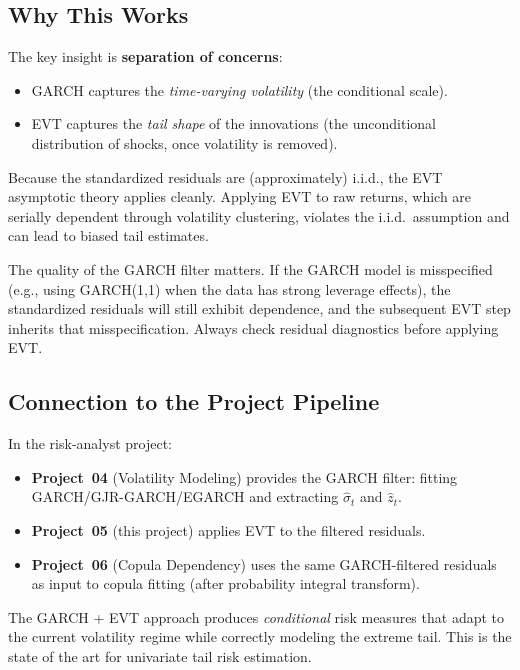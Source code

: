 \documentclass[11pt, a4paper]{article}
\theoremstyle{definition}
\theoremstyle{plain}
\theoremstyle{remark}
\begin{document}
\subsection{Why This Works}

The key insight is \textbf{separation of concerns}:
\begin{itemize}
    \item GARCH captures the \emph{time-varying volatility} (the conditional scale).
    \item EVT captures the \emph{tail shape} of the innovations (the unconditional distribution of shocks, once volatility is removed).
\end{itemize}

Because the standardized residuals are (approximately) i.i.d.,
the EVT asymptotic theory applies cleanly.
Applying EVT to raw returns, which are serially dependent through volatility clustering,
violates the i.i.d.\ assumption and can lead to biased tail estimates.

\begin{warningbox}
The quality of the GARCH filter matters.
If the GARCH model is misspecified (e.g., using GARCH(1,1) when the data has strong leverage effects),
the standardized residuals will still exhibit dependence,
and the subsequent EVT step inherits that misspecification.
Always check residual diagnostics before applying EVT.
\end{warningbox}

\subsection{Connection to the Project Pipeline}

In the risk-analyst project:
\begin{itemize}
    \item \textbf{Project~04} (Volatility Modeling) provides the GARCH filter:
          fitting GARCH/GJR-GARCH/EGARCH and extracting $\hat\sigma_t$ and $\hat{z}_t$.
    \item \textbf{Project~05} (this project) applies EVT to the filtered residuals.
    \item \textbf{Project~06} (Copula Dependency) uses the same GARCH-filtered residuals
          as input to copula fitting (after probability integral transform).
\end{itemize}

The GARCH + EVT approach produces \emph{conditional} risk measures that adapt to the current
volatility regime while correctly modeling the extreme tail.
This is the state of the art for univariate tail risk estimation.
\end{document}
